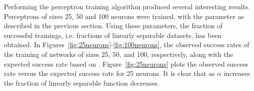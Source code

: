 Performing the perceptron training algorithm produced several interesting results.
Perceptrons of sizes 25, 50 and 100 neurons were trained, with the parameter as described in the previous section. 
Using these parameters, the fraction of successful trainings, i.e. fractions of linearly separable datasets, has been obtained. 
In Figures~\ref{fig:25neurons}-\ref{fig:100neurons}, the observed success rates of the training of networks of sizes 25, 50, and 100, respectively, along with the expected success rate based on \cite{perceptron_slides2}.
Figure~\ref{fig:25neurons} plots the observed success rate versus the expected success rate for 25 neurons.
It is clear that as \(\alpha\) increases the fraction of linearly separable function decreases.

